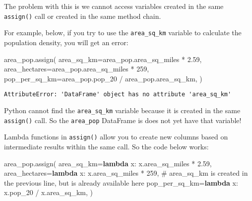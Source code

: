 \documentclass[
  letterpaper,
  DIV=11,
  numbers=noendperiod]{scrreprt}
\newenvironment{Shaded}{\begin{snugshade}}{\end{snugshade}}
\newcommand{\CommentTok}[1]{\textcolor[rgb]{0.37,0.37,0.37}{#1}}
\newcommand{\DecValTok}[1]{\textcolor[rgb]{0.68,0.00,0.00}{#1}}
\newcommand{\FloatTok}[1]{\textcolor[rgb]{0.68,0.00,0.00}{#1}}
\newcommand{\KeywordTok}[1]{\textcolor[rgb]{0.00,0.23,0.31}{\textbf{#1}}}
\newcommand{\NormalTok}[1]{\textcolor[rgb]{0.00,0.23,0.31}{#1}}
\newcommand{\OperatorTok}[1]{\textcolor[rgb]{0.37,0.37,0.37}{#1}}
\begin{document}
\begin{tcolorbox}
The problem with this is we cannot access variables created in the same
\texttt{assign()} call or created in the same method chain.

For example, below, if you try to use the \texttt{area\_sq\_km} variable
to calculate the population density, you will get an error:

\begin{Shaded}
\begin{Highlighting}[]
\NormalTok{area\_pop.assign(}
\NormalTok{    area\_sq\_km}\OperatorTok{=}\NormalTok{area\_pop.area\_sq\_miles }\OperatorTok{*} \FloatTok{2.59}\NormalTok{,}
\NormalTok{    area\_hectares}\OperatorTok{=}\NormalTok{area\_pop.area\_sq\_miles }\OperatorTok{*} \DecValTok{259}\NormalTok{,}
\NormalTok{    pop\_per\_sq\_km}\OperatorTok{=}\NormalTok{area\_pop.pop\_20 }\OperatorTok{/}\NormalTok{ area\_pop.area\_sq\_km,}
\NormalTok{)}
\end{Highlighting}
\end{Shaded}

\begin{verbatim}
AttributeError: 'DataFrame' object has no attribute 'area_sq_km'
\end{verbatim}

Python cannot find the \texttt{area\_sq\_km} variable because it is
created in the same \texttt{assign()} call. So the \texttt{area\_pop}
DataFrame is does not yet have that variable!

Lambda functions in \texttt{assign()} allow you to create new columns
based on intermediate results within the same call. So the code below
works:

\begin{Shaded}
\begin{Highlighting}[]
\NormalTok{area\_pop.assign(}
\NormalTok{    area\_sq\_km}\OperatorTok{=}\KeywordTok{lambda}\NormalTok{ x: x.area\_sq\_miles }\OperatorTok{*} \FloatTok{2.59}\NormalTok{,}
\NormalTok{    area\_hectares}\OperatorTok{=}\KeywordTok{lambda}\NormalTok{ x: x.area\_sq\_miles }\OperatorTok{*} \DecValTok{259}\NormalTok{,}
    \CommentTok{\# area\_sq\_km is created in the previous line, but is already available here}
\NormalTok{    pop\_per\_sq\_km}\OperatorTok{=}\KeywordTok{lambda}\NormalTok{ x: x.pop\_20 }\OperatorTok{/}\NormalTok{ x.area\_sq\_km,}
\NormalTok{)}
\end{Highlighting}
\end{Shaded}


\end{tcolorbox}
\end{document}
